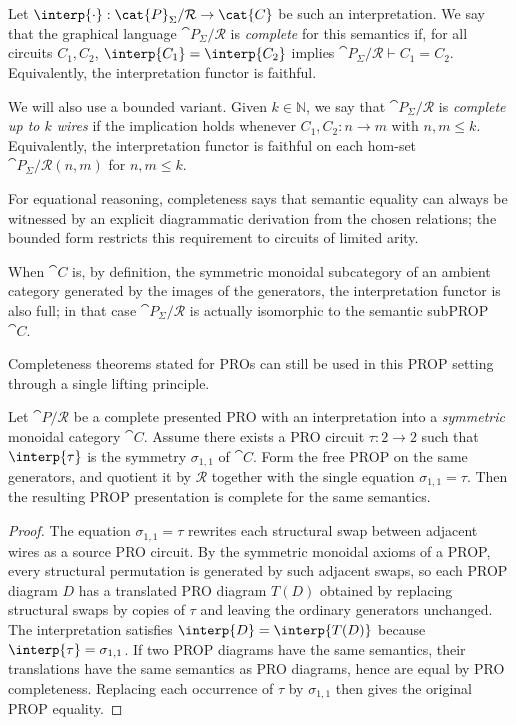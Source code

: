 \begin{definition}\label{def:semantic-completeness}
Let \(\interp{\cdot}:\cat{P}_\Sigma/\mathcal{R}\to\cat{C}\) be such an
interpretation.  We say that the graphical language \(\cat{P}_\Sigma/\mathcal{R}\)
is \emph{complete} for this semantics if, for all circuits \(C_1,C_2\), \(\interp{C_1}=\interp{C_2}\) implies
\(\cat{P}_\Sigma/\mathcal{R}\vdash C_1=C_2\).  Equivalently, the interpretation
functor is faithful.

We will also use a bounded variant. Given \(k\in\mathbb{N}\), we say that
\(\cat{P}_\Sigma/\mathcal{R}\) is \emph{complete up to \(k\) wires} if the
implication holds whenever \(C_1,C_2:n\to m\) with \(n,m\le k\).  Equivalently, the
interpretation functor is faithful on each hom-set
\(\cat{P}_\Sigma/\mathcal{R}(n,m)\) for \(n,m\le k\).
\end{definition}
For equational reasoning, completeness says that semantic equality can always be witnessed by an explicit
diagrammatic derivation from the chosen relations; the bounded form restricts this requirement to
circuits of limited arity.

When \(\cat{C}\) is, by definition, the symmetric monoidal subcategory of an
ambient category generated by the images of the generators, the interpretation
functor is also full; in that case \(\cat{P}_\Sigma/\mathcal{R}\) is actually
isomorphic to the semantic subPROP~\(\cat{C}\).

Completeness theorems stated for PROs can still be used in this PROP setting through a single
lifting principle.

\begin{lemma}\label{lem:fromprotoprop}\label{rem:fromprotoprop}
Let \(\cat{P}/\mathcal{R}\) be a complete presented PRO with an interpretation into a \emph{symmetric} monoidal category \(\cat{C}\). 
Assume there exists a PRO circuit
\(\tau:2\to 2\) such that \(\interp{\tau}\) is the symmetry \(\sigma_{1,1}\) of
\(\cat{C}\).
Form the free PROP on the same generators, and quotient it by \(\mathcal{R}\) together with the single equation
\(\sigma_{1,1}=\tau\).
Then the resulting PROP presentation is complete for the same semantics.
\end{lemma}
\begin{proof}
The equation \(\sigma_{1,1}=\tau\) rewrites each structural swap between adjacent wires as a source PRO circuit.
By the symmetric monoidal axioms of a PROP, every structural permutation is generated by such adjacent swaps,
so each PROP diagram \(D\) has a translated PRO diagram \(T(D)\) obtained by replacing structural swaps by copies of
\(\tau\) and leaving the ordinary generators unchanged.  The interpretation satisfies
\(\interp{D}=\interp{T(D)}\) because \(\interp{\tau}=\sigma_{1,1}\).  If two PROP diagrams have the same semantics,
their translations have the same semantics as PRO diagrams, hence are equal by PRO completeness.  Replacing
each occurrence of \(\tau\) by \(\sigma_{1,1}\) then gives the original PROP equality.
\end{proof}
